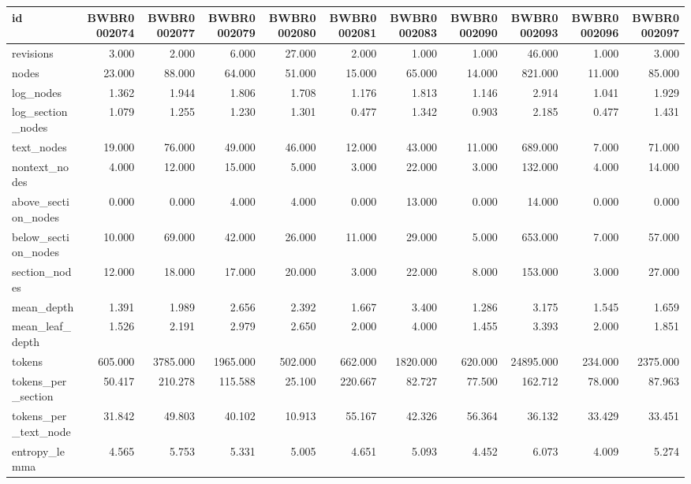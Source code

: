 \begin{tabular}{lrrrrrrrrrr}
\toprule
id & BWBR0002074 & BWBR0002077 & BWBR0002079 & BWBR0002080 & BWBR0002081 & BWBR0002083 & BWBR0002090 & BWBR0002093 & BWBR0002096 & BWBR0002097 \\
\midrule
revisions & 3.000 & 2.000 & 6.000 & 27.000 & 2.000 & 1.000 & 1.000 & 46.000 & 1.000 & 3.000 \\
\cline{1-11}
nodes & 23.000 & 88.000 & 64.000 & 51.000 & 15.000 & 65.000 & 14.000 & 821.000 & 11.000 & 85.000 \\
\cline{1-11}
log\_nodes & 1.362 & 1.944 & 1.806 & 1.708 & 1.176 & 1.813 & 1.146 & 2.914 & 1.041 & 1.929 \\
\cline{1-11}
log\_section\_nodes & 1.079 & 1.255 & 1.230 & 1.301 & 0.477 & 1.342 & 0.903 & 2.185 & 0.477 & 1.431 \\
\cline{1-11}
text\_nodes & 19.000 & 76.000 & 49.000 & 46.000 & 12.000 & 43.000 & 11.000 & 689.000 & 7.000 & 71.000 \\
\cline{1-11}
nontext\_nodes & 4.000 & 12.000 & 15.000 & 5.000 & 3.000 & 22.000 & 3.000 & 132.000 & 4.000 & 14.000 \\
\cline{1-11}
above\_section\_nodes & 0.000 & 0.000 & 4.000 & 4.000 & 0.000 & 13.000 & 0.000 & 14.000 & 0.000 & 0.000 \\
\cline{1-11}
below\_section\_nodes & 10.000 & 69.000 & 42.000 & 26.000 & 11.000 & 29.000 & 5.000 & 653.000 & 7.000 & 57.000 \\
\cline{1-11}
section\_nodes & 12.000 & 18.000 & 17.000 & 20.000 & 3.000 & 22.000 & 8.000 & 153.000 & 3.000 & 27.000 \\
\cline{1-11}
mean\_depth & 1.391 & 1.989 & 2.656 & 2.392 & 1.667 & 3.400 & 1.286 & 3.175 & 1.545 & 1.659 \\
\cline{1-11}
mean\_leaf\_depth & 1.526 & 2.191 & 2.979 & 2.650 & 2.000 & 4.000 & 1.455 & 3.393 & 2.000 & 1.851 \\
\cline{1-11}
tokens & 605.000 & 3785.000 & 1965.000 & 502.000 & 662.000 & 1820.000 & 620.000 & 24895.000 & 234.000 & 2375.000 \\
\cline{1-11}
tokens\_per\_section & 50.417 & 210.278 & 115.588 & 25.100 & 220.667 & 82.727 & 77.500 & 162.712 & 78.000 & 87.963 \\
\cline{1-11}
tokens\_per\_text\_node & 31.842 & 49.803 & 40.102 & 10.913 & 55.167 & 42.326 & 56.364 & 36.132 & 33.429 & 33.451 \\
\cline{1-11}
entropy\_lemma & 4.565 & 5.753 & 5.331 & 5.005 & 4.651 & 5.093 & 4.452 & 6.073 & 4.009 & 5.274 \\

\end{tabular}
